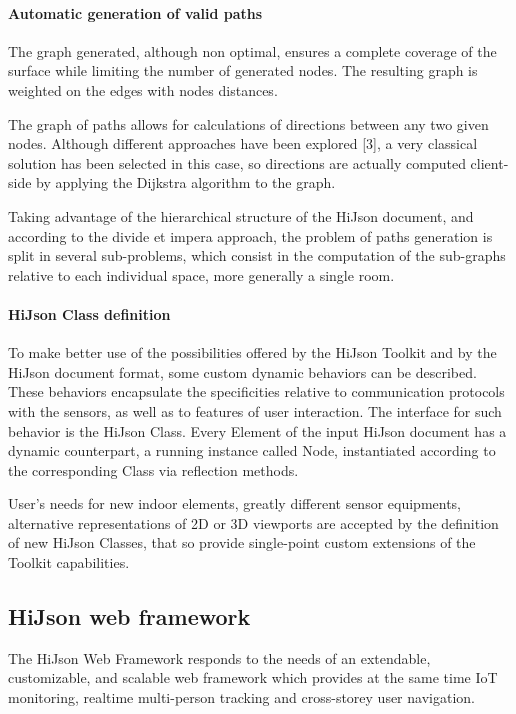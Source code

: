 \documentclass{sig-alternate}
\begin{document}
\paragraph{Automatic generation of valid paths}

The graph generated, although non optimal, ensures a complete coverage of the surface while limiting the number of generated nodes. The resulting graph is weighted on the edges with nodes distances. 

The graph of paths allows for calculations of directions between any two given nodes. Although different approaches have been explored [3], a very classical solution has been selected in this case, so directions are actually computed client-side by applying the Dijkstra algorithm to the graph.

Taking advantage of the hierarchical structure of the HiJson document, and according to the divide et impera approach, the problem of paths generation is split in several sub-problems, which consist in the computation of the sub-graphs relative to each individual space, more generally a single room. 

\paragraph{HiJson Class definition}

To make better use of the possibilities offered by the HiJson Toolkit and by the HiJson document format, some custom dynamic behaviors can be described. These behaviors encapsulate the specificities relative to communication protocols with the sensors, as well as to features of user interaction. The interface for such behavior is the HiJson Class.
Every Element of the input HiJson document has a dynamic counterpart, a running instance called  Node, instantiated according to the corresponding Class via reflection methods.


User's needs for new indoor elements, greatly different sensor equipments, alternative representations of 2D or 3D viewports are accepted by the definition of new HiJson Classes, that so provide single-point custom extensions of the Toolkit capabilities.

\subsection{HiJson web framework}

The HiJson Web Framework responds to the needs of an extendable, customizable, and scalable web framework which provides at the same time IoT monitoring, realtime multi-person tracking and cross-storey user navigation.
\end{document}
